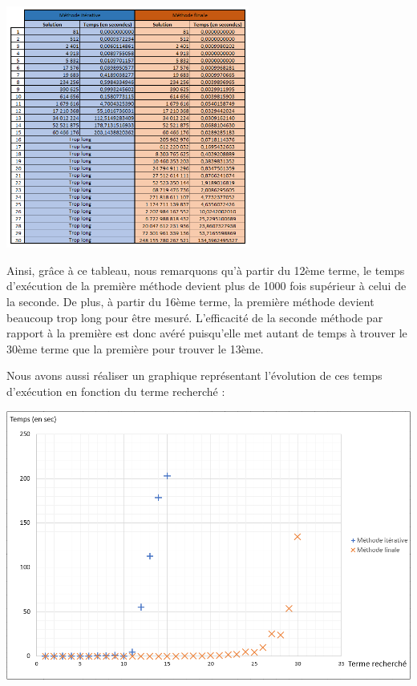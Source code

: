 \documentclass{article}
\begin{document}
\bigbreak
\begin{center}
\includegraphics[width = 8cm]{Tableau.png}
\end{center}
\bigbreak

Ainsi, grâce à ce tableau, nous remarquons qu'à partir du 12ème terme, le temps d'exécution de la première méthode devient plus de 1000 fois supérieur à celui de la seconde. De plus, à partir du 16ème terme, la première méthode devient beaucoup trop long pour être mesuré. L'efficacité de la seconde méthode par rapport à la première est donc avéré puisqu'elle met autant de temps à trouver le 30ème terme que la première pour trouver le 13ème.

Nous avons aussi réaliser un graphique représentant l'évolution de ces temps d'exécution en fonction du terme recherché :

\bigbreak
\begin{center}
\includegraphics[scale = 0.5]{Graphe.png}
\end{center}
\bigbreak
\end{document}
